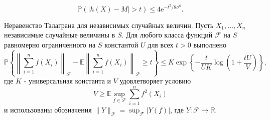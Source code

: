 \begin{remark}
\begin{suite}
\begin{equation*}
\mathbb{P} (|h(X)-M|> t)\leq 4\mathrm{e}^{-t^2/8\sigma^8}.
\end{equation*}
\end{suite}


Неравенство Талаграна для независимых случайных величин. Пусть $X_1,\dots,X_n$ независимые случайные величины в $S$. Для любого класса функций ${\mathcal{F}}$
на $S$ равномерно ограниченного  на $S$ константой $U$ для всех $t>0$ выполнено 
\[
\mathbb{P}\left\{\left\|\sum_{i=1}^n f(X_i)\right\|_{\mathcal{F}} - \mathbb{E}\left\|\sum_{i=1}^n f(X_i)\right\|_{\mathcal{F}}
 \geq t \right\}\leq K\exp\left\{-\frac{t}{UK}\log\left(1+\frac{tU}{V}\right)\right\},
\]
где $K$ - универсальная константа и $V$ удовлетворяет условию 
\[
V\geq \mathbb{E}\sup_{f\in\mathcal{F}}\sum_{i=1}^n f^2(X_i) 
\]
и использованы обозначения  $\|Y\|_{\mathcal{F}} = \sup_{\mathcal{F}}|Y(f)|
$, где $Y: \mathcal{F}\to \mathbb{R}$. 

\end{remark}


